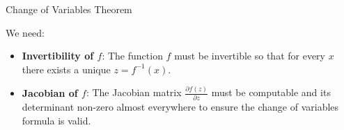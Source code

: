 \begin{frame}[allowframebreaks]{Change of Variables Theorem}
\framebreak

\large We need:
\begin{itemize}
    \item \textbf{Invertibility of $f$}: The function $f$ must be invertible so that for every $x$ there exists a unique $z = f^{-1}(x)$.
    \item \textbf{Jacobian of $f$}: The Jacobian matrix $\frac{\partial f(z)}{\partial z}$ must be computable and its determinant non-zero almost everywhere to ensure the change of variables formula is valid.
\end{itemize}

\end{frame}